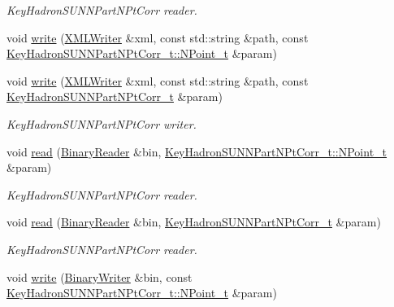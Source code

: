 \begin{DoxyCompactItemize}
\begin{DoxyCompactList}\small\item\em Key\+Hadron\+S\+U\+N\+N\+Part\+N\+Pt\+Corr reader. \end{DoxyCompactList}\item 
void \mbox{\hyperlink{namespaceHadron_a5dd8ceac99cd9e526324bf30fca8e225}{write}} (\mbox{\hyperlink{classADATXML_1_1XMLWriter}{X\+M\+L\+Writer}} \&xml, const std\+::string \&path, const \mbox{\hyperlink{structHadron_1_1KeyHadronSUNNPartNPtCorr__t_1_1NPoint__t}{Key\+Hadron\+S\+U\+N\+N\+Part\+N\+Pt\+Corr\+\_\+t\+::\+N\+Point\+\_\+t}} \&param)
\item 
void \mbox{\hyperlink{namespaceHadron_abf12b2168d7e3741fcc320bf4b8c53df}{write}} (\mbox{\hyperlink{classADATXML_1_1XMLWriter}{X\+M\+L\+Writer}} \&xml, const std\+::string \&path, const \mbox{\hyperlink{structHadron_1_1KeyHadronSUNNPartNPtCorr__t}{Key\+Hadron\+S\+U\+N\+N\+Part\+N\+Pt\+Corr\+\_\+t}} \&param)
\begin{DoxyCompactList}\small\item\em Key\+Hadron\+S\+U\+N\+N\+Part\+N\+Pt\+Corr writer. \end{DoxyCompactList}\item 
void \mbox{\hyperlink{namespaceHadron_a61a08fc66a0ee31593a2d5fff5657f7c}{read}} (\mbox{\hyperlink{classADATIO_1_1BinaryReader}{Binary\+Reader}} \&bin, \mbox{\hyperlink{structHadron_1_1KeyHadronSUNNPartNPtCorr__t_1_1NPoint__t}{Key\+Hadron\+S\+U\+N\+N\+Part\+N\+Pt\+Corr\+\_\+t\+::\+N\+Point\+\_\+t}} \&param)
\begin{DoxyCompactList}\small\item\em Key\+Hadron\+S\+U\+N\+N\+Part\+N\+Pt\+Corr reader. \end{DoxyCompactList}\item 
void \mbox{\hyperlink{namespaceHadron_a475e00d642e0578e7bbe956bbbf37aac}{read}} (\mbox{\hyperlink{classADATIO_1_1BinaryReader}{Binary\+Reader}} \&bin, \mbox{\hyperlink{structHadron_1_1KeyHadronSUNNPartNPtCorr__t}{Key\+Hadron\+S\+U\+N\+N\+Part\+N\+Pt\+Corr\+\_\+t}} \&param)
\begin{DoxyCompactList}\small\item\em Key\+Hadron\+S\+U\+N\+N\+Part\+N\+Pt\+Corr reader. \end{DoxyCompactList}\item 
void \mbox{\hyperlink{namespaceHadron_acd7055ec4bbdda7ceb335f7271aee72e}{write}} (\mbox{\hyperlink{classADATIO_1_1BinaryWriter}{Binary\+Writer}} \&bin, const \mbox{\hyperlink{structHadron_1_1KeyHadronSUNNPartNPtCorr__t_1_1NPoint__t}{Key\+Hadron\+S\+U\+N\+N\+Part\+N\+Pt\+Corr\+\_\+t\+::\+N\+Point\+\_\+t}} \&param)

\end{DoxyCompactItemize}
